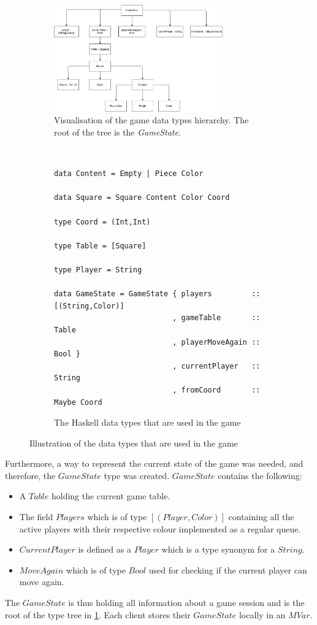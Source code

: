 \documentclass[a4paper]{article}
\begin{document}
\begin{figure}[ht!]
    \centering
\begin{subfigure}{\textwidth}
    \centering
    \includegraphics[scale=0.8,width=0.8\textwidth]{figure/gameTypesHierarchy}
    \caption{Visualisation of the game data types hierarchy. The root of the tree is the \textit{GameState}.}
\end{subfigure}
~
\begin{subfigure}{\textwidth}
\begin{lstlisting}
data Content = Empty | Piece Color

data Square = Square Content Color Coord

type Coord = (Int,Int)

type Table = [Square]

type Player = String

data GameState = GameState { players         :: [(String,Color)]
                           , gameTable       :: Table
                           , playerMoveAgain :: Bool }
                           , currentPlayer   :: String
                           , fromCoord       :: Maybe Coord
\end{lstlisting}
    \caption{The Haskell data types that are used in the game}
    \end{subfigure}
    \caption{Illustration of the data types that are used in the game}
    \label{fig:gameTypes}
\end{figure}


Furthermore, a way to represent the current state of the game was needed, and therefore, the $GameState$ type was created. $GameState$ contains the following: 
\begin{itemize}
    \item A $Table$ holding the current game table.
    \item The field $Players$ which is of type $[(Player,Color)]$ containing all the active players with their respective colour implemented as a regular queue.
    \item $CurrentPlayer$ is defined as a $Player$ which is a type synonym for a $String$.
    \item $MoveAgain$ which is of type $Bool$ used for checking if the current player can move again.
    
\end{itemize}
The $GameState$ is thus holding all information about a game session and is the root of the type tree in \cref{fig:gameTypes}. Each client stores their $GameState$ locally in an $MVar$.
\end{document}

